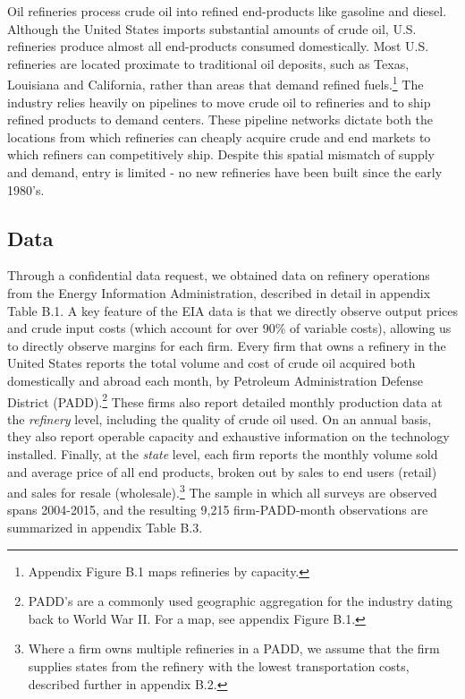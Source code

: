 \documentclass[12pt]{article}
\begin{document}
Oil refineries process crude oil into refined end-products like gasoline and diesel. Although the United States imports substantial amounts of crude oil, U.S. refineries produce almost all end-products consumed domestically. Most U.S. refineries are located proximate to traditional oil deposits, such as Texas, Louisiana and California, rather than areas that demand refined fuels.\footnote{Appendix Figure B.1 maps refineries by capacity.}   The industry relies heavily on pipelines to move crude oil to refineries and to ship refined products to demand centers. These pipeline networks dictate both the locations from which refineries can cheaply acquire crude and end markets to which refiners can competitively ship.  Despite this spatial mismatch of supply and demand, entry is limited - no new refineries have been built since the early 1980's.

\subsection{Data \label{sec:Data}}

Through a confidential data request, we obtained data on refinery operations from the Energy Information Administration, described in detail in appendix Table B.1. A key feature of the EIA data is that we directly observe output prices and crude input costs (which account for over 90\% of variable costs), allowing us to directly observe margins for each firm. Every firm that owns a refinery in the United States reports the total volume and cost of crude oil acquired both domestically and abroad each month, by Petroleum Administration Defense District (PADD).\footnote{PADD's are a commonly used geographic aggregation for the industry dating back to World War II. For a map, see appendix Figure B.1.} These firms also report detailed monthly production data at the \emph{refinery} level, including the quality of crude oil used. On an annual basis, they also report operable capacity and exhaustive information on the technology installed. Finally, at the \emph{state} level, each firm reports the monthly volume sold and average price of all end products, broken out by sales to end users (retail) and sales for resale (wholesale).\footnote{Where a firm owns multiple refineries in a PADD, we assume that the firm supplies states from the refinery with the lowest transportation costs, described further in appendix B.2.} The sample in which all surveys are observed spans 2004-2015, and the resulting 9,215 firm-PADD-month observations are summarized in appendix Table B.3.
\end{document}

